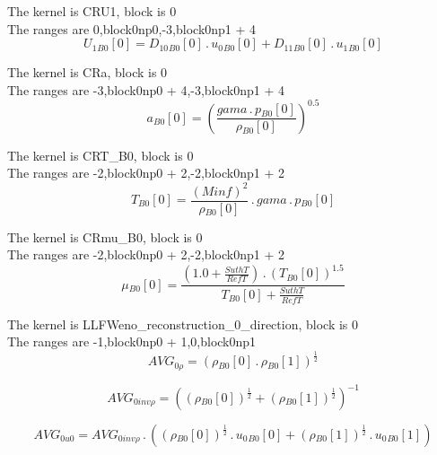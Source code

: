 \documentclass{article}
\begin{document}
\noindent The kernel is CRU1, block is 0\\\noindent The ranges are 0,block0np0,-3,block0np1 + 4\\\begin{dmath}{U_{1}{_{B0}}}[{0}] = {D_{10}{_{B0}}}[{0}] \,.\, {u_{0}{_{B0}}}[{0}] + {D_{11}{_{B0}}}[{0}] \,.\, {u_{1}{_{B0}}}[{0}]\end{dmath}

\noindent The kernel is CRa, block is 0\\\noindent The ranges are -3,block0np0 + 4,-3,block0np1 + 4\\\begin{dmath}{a{_{B0}}}[{0}] = \left(\frac{gama \,.\, {p{_{B0}}}[{0}]}{{\rho{_{B0}}}[{0}]} \right)^{0.5}\end{dmath}

\noindent The kernel is CRT_B0, block is 0\\\noindent The ranges are -2,block0np0 + 2,-2,block0np1 + 2\\\begin{dmath}{T{_{B0}}}[{0}] = \frac{\left(Minf \right)^{2}}{{\rho{_{B0}}}[{0}]} \,.\, gama \,.\, {p{_{B0}}}[{0}]\end{dmath}

\noindent The kernel is CRmu_B0, block is 0\\\noindent The ranges are -2,block0np0 + 2,-2,block0np1 + 2\\\begin{dmath}{\mu{_{B0}}}[{0}] = \frac{\left(1.0 + \frac{SuthT}{RefT}\right) \,.\, \left({T{_{B0}}}[{0}] \right)^{1.5}}{{T{_{B0}}}[{0}] + \frac{SuthT}{RefT}}\end{dmath}

\noindent The kernel is LLFWeno_reconstruction_0_direction, block is 0\\\noindent The ranges are -1,block0np0 + 1,0,block0np1\\\begin{dmath}AVG_{0 \rho} = \left({\rho{_{B0}}}[{0}] \,.\, {\rho{_{B0}}}[{1}] \right)^{\frac{1}{2}}\end{dmath}

\begin{dmath}AVG_{0 inv \rho} = \left(\left({\rho{_{B0}}}[{0}] \right)^{\frac{1}{2}} + \left({\rho{_{B0}}}[{1}] \right)^{\frac{1}{2}} \right)^{-1}\end{dmath}

\begin{dmath}AVG_{0 u0} = AVG_{0 inv \rho} \,.\, \left(\left({\rho{_{B0}}}[{0}] \right)^{\frac{1}{2}} \,.\, {u_{0}{_{B0}}}[{0}] + \left({\rho{_{B0}}}[{1}] \right)^{\frac{1}{2}} \,.\, {u_{0}{_{B0}}}[{1}]\right)\end{dmath}
\end{document}
